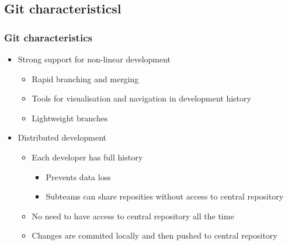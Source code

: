 \subsection[]{Git characteristicsl}
\begin{frame}
\frametitle{Git characteristics}
\begin{itemize}
	\item Strong support for non-linear development
		\begin{itemize}
		\item Rapid branching and merging
		\item Tools for visualisation and navigation in development history
		\item Lightweight branches %
		\end{itemize}
	\item Distributed development
		\begin{itemize}
		\item Each developer has full history
			\begin{itemize}
			\item Prevents data loss
			\item Subteams can share reposities without access to central repository
			\end{itemize}
		\item No need to have access to central repository all the time
		\item Changes are commited locally and then pushed to central repository
		\end{itemize}%

\end{itemize}
\end{frame}

